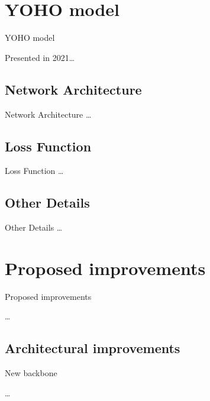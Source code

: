 

\section[YOHO model]{YOHO model}

	\begin{frame}{YOHO model}
			
		Presented in 2021\cite{Venkatesh_2022}\dots
		
		\note{
			\dots			
		}		
		
	\end{frame}

	\subsection[Network Architecture]{Network Architecture}
	\begin{frame}{Network Architecture}
		\dots		
		
		\note{
			\dots
		}
	\end{frame}

	\subsection[Loss Function]{Loss Function}
	\begin{frame}{Loss Function}
		\dots		
		
		\note{
			\dots
		}
	\end{frame}
	
	\subsection[Other Details]{Other Details}
	\begin{frame}{Other Details}
		\dots		
		
		\note{
			\dots
		}
	\end{frame}


\section[Proposed improvements]{Proposed improvements}

	\begin{frame}{Proposed improvements}
			
		\dots
		
		\note{
			\dots			
		}		
		
	\end{frame}
	

	\subsection[Architectural improvements]{Architectural improvements}
	\begin{frame}{New backbone}
			
		\dots
		
		\note{
			\dots			
		}		
		
	\end{frame}
